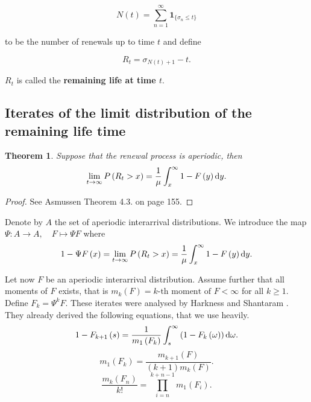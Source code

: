 \documentclass[12pt,a4paper]{scrartcl}
\newtheorem{theorem}{Theorem}[section]
\numberwithin{equation}{section}
\begin{document}

$$ N\left(t\right) = \sum_{n = 1}^{\infty} \textbf{1}_{\lbrace \sigma_n \leq t\rbrace } $$

to be the number of renewals up to time $t$ and define

$$ R_t = \sigma_{N\left(t\right)+1} - t. $$

$R_t$ is called the \textbf{remaining life at time $t$}.

\subsection{Iterates of the limit distribution of the remaining life time}
\begin{theorem}
Suppose that the renewal process is aperiodic, then
\begin{equation}
\lim_{t \to \infty} P\left(R_t > x\right) = \frac{1}{\mu} \int_{x}^{\infty} 1- F\left(y\right) \textnormal{d}y.
\end{equation}
\end{theorem}
\begin{proof}
See Asmussen \cite{asmussen} Theorem 4.3. on page 155.
\end{proof}

Denote by $ A $ the set of aperiodic interarrival distributions. We introduce the map $\Psi : A \to A, \quad F \mapsto \Psi F$ where 
\begin{equation}
\label{eq:remaininglife}
1 - \Psi F\left(x\right) = \lim_{t \to \infty} P\left(R_t > x\right) = \frac{1}{\mu} \int_{x}^{\infty} 1- F\left(y\right) \textnormal{d}y.
\end{equation}

Let now $ F $ be an aperiodic interarrival distribution. Assume further that all moments of $F$ exists, that is $m_k\left(F\right) = \text{$k$-th moment of $F$} < \infty$ for all $ k\geq 1$. Define $F_k = \Psi^k F$. These iterates were analysed by Harkness and Shantaram \cite{harkness}. They already derived the following equations, that we use heavily.
\begin{equation}
1- F_{k+1}\left(s\right) = \frac{1}{m_1\left(F_k\right)} \int_s^{\infty} \left(1-F_k\left(\omega\right) \right) \textnormal{d}\omega.
\end{equation}
\begin{equation}
m_1\left(F_k\right) = \frac{m_{k+1}\left(F\right)}{\left(k+1\right)m_k\left(F\right)}.
\end{equation}
\begin{equation}
\frac{m_k\left(F_n\right)}{k!} = \prod_{i=n}^{k+n-1} m_1\left(F_i\right).
\end{equation}
\end{document}
